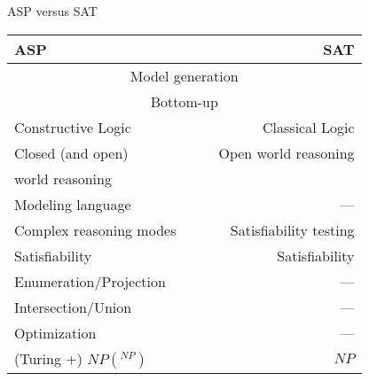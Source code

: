 \begin{frame}[c]{ASP versus SAT}
  \begin{center}\renewcommand{\arraystretch}{1.2}
    \begin{tabular}{lc|cr}
      \alert{ASP}                           &&& \alert{SAT}\\
      \hline\hline
      \multicolumn{4}{c}{Model generation}\\\hline
      \multicolumn{4}{c}{Bottom-up}\\\hline
      Constructive Logic                    &&& Classical Logic\\\hline
      Closed (and open)                     &&& Open world reasoning\\[-5pt]
      \qquad world reasoning                &&& \\\hline
      Modeling language                     &&&             ---\\\hline
      Complex reasoning modes               &&& Satisfiability testing\\
      \hspace*{12pt}Satisfiability          &&& Satisfiability\hspace*{12pt}\\[-3pt]
      \hspace*{12pt}Enumeration/Projection  &&& ---\hspace*{12pt}\\[-3pt]
      \hspace*{12pt}Intersection/Union      &&& ---\hspace*{12pt}\\[-3pt]
      \hspace*{12pt}Optimization            &&& ---\hspace*{12pt}\\\hline
      {\footnotesize (Turing +)} $NP(^{NP})$&&& $NP$
    \end{tabular}
  \end{center}
\end{frame}
%
